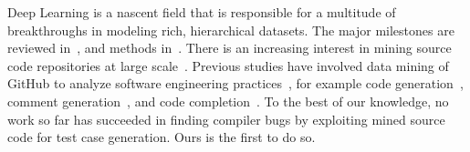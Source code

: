 
Deep Learning is a nascent field that is responsible for a multitude of breakthroughs in modeling rich, hierarchical datasets. The major milestones are reviewed in~\cite{Wang2017}, and methods in~\cite{Schmidhuber2014}. There is an increasing interest in mining source code repositories at large scale~\cite{Allamanis2017a}.
Previous studies have involved data mining of GitHub to analyze software engineering practices~\cite{Wu2014,Guzman2014,Baishakhi2014a,Vasilescu2015}, for example code generation~\cite{Zhang2015a}, comment generation~\cite{Wong2013}, and code completion~\cite{Raychev2014}.
To the best of our knowledge, no work so far has succeeded in finding compiler bugs by exploiting mined source code for test case generation. Ours is the first to do so.
